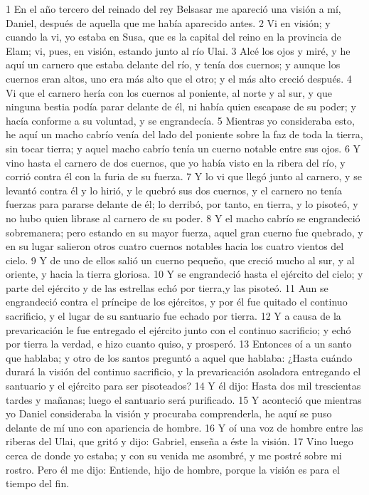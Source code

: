 1 En el año tercero del reinado del rey Belsasar me apareció una visión a mí, Daniel, después de aquella que me había aparecido antes.
2 Vi en visión; y cuando la vi, yo estaba en Susa, que es la capital del reino en la provincia de Elam; vi, pues, en visión, estando junto al río Ulai.
3 Alcé los ojos y miré, y he aquí un carnero que estaba delante del río, y tenía dos cuernos; y aunque los cuernos eran altos, uno era más alto que el otro; y el más alto creció después.
4 Vi que el carnero hería con los cuernos al poniente, al norte y al sur, y que ninguna bestia podía parar delante de él, ni había quien escapase de su poder; y hacía conforme a su voluntad, y se engrandecía.
5 Mientras yo consideraba esto, he aquí un macho cabrío venía del lado del poniente sobre la faz de toda la tierra, sin tocar tierra; y aquel macho cabrío tenía un cuerno notable entre sus ojos.
6 Y vino hasta el carnero de dos cuernos, que yo había visto en la ribera del río, y corrió contra él con la furia de su fuerza.
7 Y lo vi que llegó junto al carnero, y se levantó contra él y lo hirió, y le quebró sus dos cuernos, y el carnero no tenía fuerzas para pararse delante de él; lo derribó, por tanto, en tierra, y lo pisoteó, y no hubo quien librase al carnero de su poder.
8 Y el macho cabrío se engrandeció sobremanera; pero estando en su mayor fuerza, aquel gran cuerno fue quebrado, y en su lugar salieron otros cuatro cuernos notables hacia los cuatro vientos del cielo.
9 Y de uno de ellos salió un cuerno pequeño, que creció mucho al sur, y al oriente, y hacia la tierra gloriosa.
10 Y se engrandeció hasta el ejército del cielo; y parte del ejército y de las estrellas echó por tierra,y las pisoteó.
11 Aun se engrandeció contra el príncipe de los ejércitos, y por él fue quitado el continuo sacrificio, y el lugar de su santuario fue echado por tierra.
12 Y a causa de la prevaricación le fue entregado el ejército junto con el continuo sacrificio; y echó por tierra la verdad, e hizo cuanto quiso, y prosperó.
13 Entonces oí a un santo que hablaba; y otro de los santos preguntó a aquel que hablaba: ¿Hasta cuándo durará la visión del continuo sacrificio, y la prevaricación asoladora entregando el santuario y el ejército para ser pisoteados?
14 Y él dijo: Hasta dos mil trescientas tardes y mañanas; luego el santuario será purificado.
15 Y aconteció que mientras yo Daniel consideraba la visión y procuraba comprenderla, he aquí se puso delante de mí uno con apariencia de hombre.
16 Y oí una voz de hombre entre las riberas del Ulai, que gritó y dijo: Gabriel, enseña a éste la visión.
17 Vino luego cerca de donde yo estaba; y con su venida me asombré, y me postré sobre mi rostro. Pero él me dijo: Entiende, hijo de hombre, porque la visión es para el tiempo del fin.
